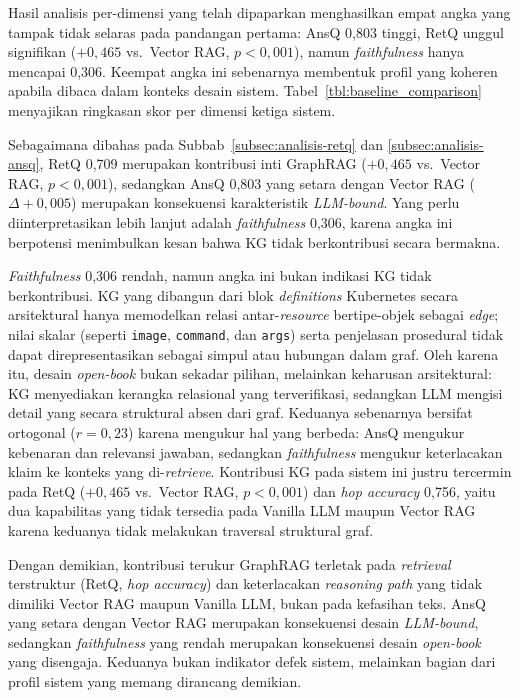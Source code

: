 Hasil analisis per-dimensi yang telah dipaparkan menghasilkan empat angka yang tampak tidak selaras pada pandangan pertama: AnsQ 0,803 tinggi, RetQ unggul signifikan ($+0{,}465$ vs.\ Vector RAG, $p{<}0{,}001$), namun \textit{faithfulness} hanya mencapai 0,306. Keempat angka ini sebenarnya membentuk profil yang koheren apabila dibaca dalam konteks desain sistem. Tabel~\ref{tbl:baseline_comparison} menyajikan ringkasan skor per dimensi ketiga sistem.

Sebagaimana dibahas pada Subbab~\ref{subsec:analisis-retq} dan \ref{subsec:analisis-ansq}, RetQ 0,709 merupakan kontribusi inti GraphRAG ($+0{,}465$ vs.\ Vector RAG, $p{<}0{,}001$), sedangkan AnsQ 0,803 yang setara dengan Vector RAG ($\Delta{+}0{,}005$) merupakan konsekuensi karakteristik \textit{LLM-bound}. Yang perlu diinterpretasikan lebih lanjut adalah \textit{faithfulness} 0,306, karena angka ini berpotensi menimbulkan kesan bahwa KG tidak berkontribusi secara bermakna.

\textit{Faithfulness} 0,306 rendah, namun angka ini bukan indikasi KG tidak berkontribusi. KG yang dibangun dari blok \textit{definitions} Kubernetes secara arsitektural hanya memodelkan relasi antar-\textit{resource} bertipe-objek sebagai \textit{edge}; nilai skalar (seperti \texttt{image}, \texttt{command}, dan \texttt{args}) serta penjelasan prosedural tidak dapat direpresentasikan sebagai simpul atau hubungan dalam graf. Oleh karena itu, desain \textit{open-book} bukan sekadar pilihan, melainkan keharusan arsitektural: KG menyediakan kerangka relasional yang terverifikasi, sedangkan LLM mengisi detail yang secara struktural absen dari graf. Keduanya sebenarnya bersifat ortogonal ($r{=}0{,}23$) karena mengukur hal yang berbeda: AnsQ mengukur kebenaran dan relevansi jawaban, sedangkan \textit{faithfulness} mengukur keterlacakan klaim ke konteks yang di-\textit{retrieve}. Kontribusi KG pada sistem ini justru tercermin pada RetQ ($+0{,}465$ vs.\ Vector RAG, $p{<}0{,}001$) dan \textit{hop accuracy} 0,756, yaitu dua kapabilitas yang tidak tersedia pada Vanilla LLM maupun Vector RAG karena keduanya tidak melakukan traversal struktural graf.

Dengan demikian, kontribusi terukur GraphRAG terletak pada \textit{retrieval} terstruktur (RetQ, \textit{hop accuracy}) dan keterlacakan \textit{reasoning path} yang tidak dimiliki Vector RAG maupun Vanilla LLM, bukan pada kefasihan teks. AnsQ yang setara dengan Vector RAG merupakan konsekuensi desain \textit{LLM-bound}, sedangkan \textit{faithfulness} yang rendah merupakan konsekuensi desain \textit{open-book} yang disengaja. Keduanya bukan indikator defek sistem, melainkan bagian dari profil sistem yang memang dirancang demikian.

